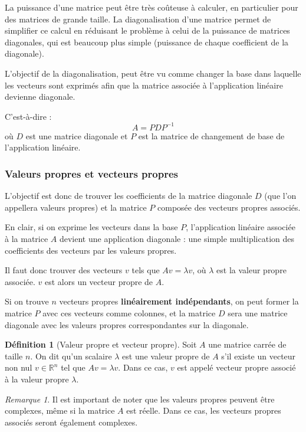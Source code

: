 \documentclass[11pt,a4paper]{article}
\numberwithin{equation}{section}
\theoremstyle{plain}
\theoremstyle{definition}
\newtheorem{definition}[theorem]{Définition}
\theoremstyle{remark}
\newtheorem*{remark}{Remarque}
\begin{document}
La puissance d'une matrice peut être très coûteuse à calculer, en particulier pour des matrices de grande taille. La diagonalisation d'une matrice permet de simplifier ce calcul en réduisant le problème à celui de la puissance de matrices diagonales, qui est beaucoup plus simple (puissance de chaque coefficient de la diagonale).

L'objectif de la diagonalisation, peut être vu comme changer la base dans laquelle les vecteurs sont exprimés afin que la matrice associée à l'application linéaire devienne diagonale.

C'est-à-dire :
\[
    A = PDP^{-1}
\]
où \(D\) est une matrice diagonale et \(P\) est la matrice de changement de base de l'application linéaire.

\subsubsection{Valeurs propres et vecteurs propres}

L'objectif est donc de trouver les coefficients de la matrice diagonale \(D\) (que l'on appellera valeurs propres) et la matrice $P$ composée des vecteurs propres associés.

En clair, si on exprime les vecteurs dans la base $P$, l'application linéaire associée à la matrice \(A\) devient une application diagonale : une simple multiplication des coefficients des vecteurs par les valeurs propres.

Il faut donc trouver des vecteurs \(v\) tels que \(Av = \lambda v\), où \(\lambda\) est la valeur propre associée. $v$ est alors un vecteur propre de \(A\).

Si on trouve $n$ vecteurs propres \textbf{linéairement indépendants}, on peut former la matrice \(P\) avec ces vecteurs comme colonnes, et la matrice \(D\) sera une matrice diagonale avec les valeurs propres correspondantes sur la diagonale.

\begin{definition}[Valeur propre et vecteur propre]
    Soit \(A\) une matrice carrée de taille \(n\). On dit qu'un scalaire \(\lambda\) est une valeur propre de \(A\) s'il existe un vecteur non nul \(v \in \mathbb{R}^n\) tel que \(Av = \lambda v\). Dans ce cas, \(v\) est appelé vecteur propre associé à la valeur propre \(\lambda\).
\end{definition}

\begin{remark}
Il est important de noter que les valeurs propres peuvent être complexes, même si la matrice \(A\) est réelle. Dans ce cas, les vecteurs propres associés seront également complexes.
\end{remark}
\end{document}
